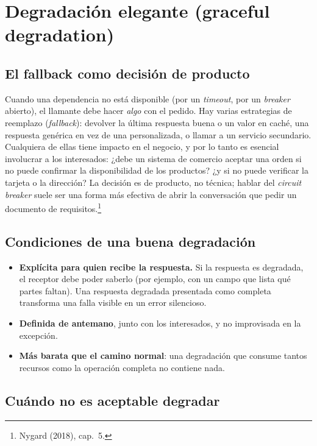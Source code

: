 \documentclass[variant=apuntes,cover=institutional,mode=screen]{ua-engineering-v6-article}
\begin{document}
\section{Degradación elegante (graceful degradation)}\label{sec:degradacion}

\subsection{El fallback como decisión de producto}

Cuando una dependencia no está disponible (por un \emph{timeout}, por un \emph{breaker} abierto), el llamante debe hacer \emph{algo} con el pedido. Hay varias estrategias de reemplazo (\emph{fallback}): devolver la última respuesta buena o un valor en caché, una respuesta genérica en vez de una personalizada, o llamar a un servicio secundario. Cualquiera de ellas tiene impacto en el negocio, y por lo tanto es esencial involucrar a los interesados: ¿debe un sistema de comercio aceptar una orden si no puede confirmar la disponibilidad de los productos? ¿y si no puede verificar la tarjeta o la dirección? La decisión es de producto, no técnica; hablar del \emph{circuit breaker} suele ser una forma más efectiva de abrir la conversación que pedir un documento de requisitos.\footnote{Nygard (2018), cap.~5.}

\subsection{Condiciones de una buena degradación}

\begin{itemize}
\item \textbf{Explícita para quien recibe la respuesta.} Si la respuesta es degradada, el receptor debe poder saberlo (por ejemplo, con un campo que lista qué partes faltan). Una respuesta degradada presentada como completa transforma una falla visible en un error silencioso.
\item \textbf{Definida de antemano}, junto con los interesados, y no improvisada en la excepción.
\item \textbf{Más barata que el camino normal}: una degradación que consume tantos recursos como la operación completa no contiene nada.
\end{itemize}

\subsection{Cuándo no es aceptable degradar}
\end{document}

